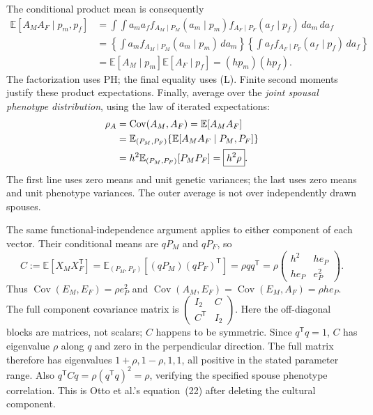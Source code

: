 The conditional product mean is consequently
\begin{align*}
 \mathbb E[A_MA_F\mid p_m,p_f]
 &=\int\!\!\int a_ma_f
 f_{A_M\mid P_M}(a_m\mid p_m)
 f_{A_F\mid P_F}(a_f\mid p_f)\,da_m\,da_f\\
 &=\left\{\int a_m f_{A_M\mid P_M}(a_m\mid p_m)\,da_m\right\}
   \left\{\int a_f f_{A_F\mid P_F}(a_f\mid p_f)\,da_f\right\}\\
 &=\mathbb E[A_M\mid p_m]\mathbb E[A_F\mid p_f]
   =(hp_m)(hp_f).
\end{align*}
The factorization uses PH; the final equality uses (L).
Finite second moments justify these product expectations. Finally,
average over the \emph{joint spousal phenotype distribution}, using the
law of iterated expectations:
\begin{align}
 \rho_A
 &=\operatorname{Cov}(A_M,A_F)
   =\mathbb E[A_MA_F]\notag\\
 &=\mathbb E_{(P_M,P_F)}
       \{\mathbb E[A_MA_F\mid P_M,P_F]\}\notag\\
 &=h^2\mathbb E_{(P_M,P_F)}[P_MP_F]
   =\boxed{h^2\rho}.
 \label{eq:m-def}
\end{align}
The first line uses zero means and unit genetic variances; the last uses
zero means and unit phenotype variances. The outer average is not over
independently drawn spouses.

The same functional-independence argument applies to either component
of each vector. Their conditional means are $qP_M$ and $qP_F$, so
\begin{equation}
 C:=\mathbb E[X_MX_F^{\mathsf T}]
 =\mathbb E_{(P_M,P_F)}[(qP_M)(qP_F)^{\mathsf T}]
 =\rho qq^{\mathsf T}
 =\rho\begin{pmatrix}h^2&h e_P\\h e_P&e_P^2\end{pmatrix}.
 \label{eq:ge-cross}
\end{equation}
Thus $\operatorname{Cov}(E_M,E_F)=\rho e_P^2$ and
$\operatorname{Cov}(A_M,E_F)=\operatorname{Cov}(E_M,A_F)=\rho h e_P$.
The full component covariance matrix is
$\left(\begin{smallmatrix}I_2&C\\C^{\mathsf T}&I_2\end{smallmatrix}\right)$.
Here the off-diagonal blocks are matrices, not scalars; $C$ happens to
be symmetric. Since $q^{\mathsf T}q=1$, $C$ has eigenvalue $\rho$ along $q$ and zero in the perpendicular direction. The full matrix therefore has eigenvalues
$1+\rho,1-\rho,1,1$, all positive in the stated parameter range.
Also $q^{\mathsf T}Cq=\rho(q^{\mathsf T}q)^2=\rho$, verifying the
specified spouse phenotype correlation. This is Otto et al.'s
equation~(22) after deleting the cultural component.

